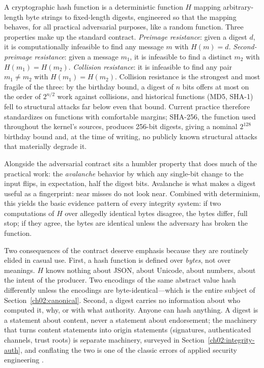 A cryptographic hash function is a deterministic function $H$ mapping
arbitrary-length byte strings to fixed-length digests, engineered so
that the mapping behaves, for all practical adversarial purposes, like
a random function. Three properties make up the standard contract.
\emph{Preimage resistance}: given a digest $d$, it is computationally
infeasible to find any message $m$ with $H(m) = d$. \emph{Second-preimage
resistance}: given a message $m_1$, it is infeasible to find a distinct
$m_2$ with $H(m_1) = H(m_2)$. \emph{Collision resistance}: it is
infeasible to find any pair $m_1 \neq m_2$ with $H(m_1) = H(m_2)$.
Collision resistance is the strongest and most fragile of the three:
by the birthday bound, a digest of $n$ bits offers at most on the order
of $2^{n/2}$ work against collisions, and historical functions (MD5,
SHA-1) fell to structural attacks far below even that bound. Current
practice therefore standardizes on functions with comfortable margins;
SHA-256, the function used throughout the kernel's sources, produces
256-bit digests, giving a nominal $2^{128}$ birthday bound and, at the
time of writing, no publicly known structural attacks that materially
degrade it.

Alongside the adversarial contract sits a humbler property that does
much of the practical work: the \emph{avalanche} behavior by which any
single-bit change to the input flips, in expectation, half the digest
bits. Avalanche is what makes a digest useful as a fingerprint: near
misses do not look near. Combined with determinism, this yields the
basic evidence pattern of every integrity system: if two computations
of $H$ over allegedly identical bytes disagree, the bytes differ,
full stop; if they agree, the bytes are identical unless the
adversary has broken the function.

Two consequences of the contract deserve emphasis because they are
routinely elided in casual use. First, a hash function is defined over
\emph{bytes}, not over meanings. $H$ knows nothing about JSON, about
Unicode, about numbers, about the intent of the producer. Two encodings
of the same abstract value hash differently unless the encodings are
byte-identical---which is the entire subject of
Section~\ref{ch02:canonical}. Second, a digest carries no information
about who computed it, why, or with what authority. Anyone can hash
anything. A digest is a statement about content, never a statement
about endorsement; the machinery that turns content statements into
origin statements (signatures, authenticated channels, trust roots)
is separate machinery, surveyed in Section~\ref{ch02:integrity-auth},
and conflating the two is one of the classic errors of applied
security engineering \cite{anderson}.

